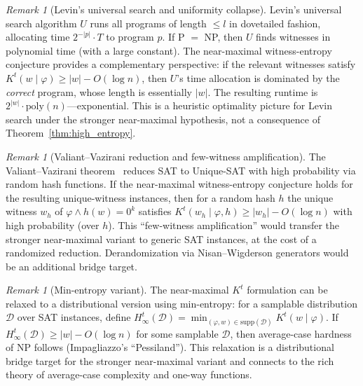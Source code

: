 \documentclass[aps,prd,twocolumn,superscriptaddress,nofootinbib]{revtex4-2}
\theoremstyle{definition}
\theoremstyle{remark}
\newtheorem{remark}[theorem]{Remark}
\begin{document}
\begin{remark}[Levin's universal search and uniformity collapse]
\label{rem:levin-uniformity}
Levin's universal search algorithm $U$ runs all programs of length $\leq l$ in dovetailed fashion, allocating time $2^{-|p|} \cdot T$ to program $p$. If P $=$ NP, then $U$ finds witnesses in polynomial time (with a large constant). The near-maximal witness-entropy conjecture provides a complementary perspective: if the relevant witnesses satisfy $K^t(w \mid \varphi) \geq |w| - O(\log n)$, then $U$'s time allocation is dominated by the \emph{correct} program, whose length is essentially $|w|$. The resulting runtime is $2^{|w|} \cdot \mathrm{poly}(n)$---exponential. This is a heuristic optimality picture for Levin search under the stronger near-maximal hypothesis, not a consequence of Theorem~\ref{thm:high_entropy}.
\end{remark}

\begin{remark}[Valiant--Vazirani reduction and few-witness amplification]
\label{rem:valiant-vazirani}
The Valiant--Vazirani theorem~\cite{ValiantVazirani1986} reduces SAT to Unique-SAT with high probability via random hash functions. If the near-maximal witness-entropy conjecture holds for the resulting unique-witness instances, then for a random hash $h$ the unique witness $w_h$ of $\varphi \wedge h(w) = 0^k$ satisfies $K^t(w_h \mid \varphi, h) \geq |w_h| - O(\log n)$ with high probability (over $h$). This ``few-witness amplification'' would transfer the stronger near-maximal variant to generic SAT instances, at the cost of a randomized reduction. Derandomization via Nisan--Wigderson generators would be an additional bridge target.
\end{remark}

\begin{remark}[Min-entropy variant]
\label{rem:min-entropy}
The near-maximal $K^t$ formulation can be relaxed to a distributional version using min-entropy: for a samplable distribution $\mathcal{D}$ over SAT instances, define $H_\infty^t(\mathcal{D}) = \min_{(\varphi, w) \in \mathrm{supp}(\mathcal{D})} K^t(w \mid \varphi)$. If $H_\infty^t(\mathcal{D}) \geq |w| - O(\log n)$ for some samplable $\mathcal{D}$, then average-case hardness of NP follows (Impagliazzo's ``Pessiland''). This relaxation is a distributional bridge target for the stronger near-maximal variant and connects to the rich theory of average-case complexity and one-way functions.
\end{remark}
\end{document}
